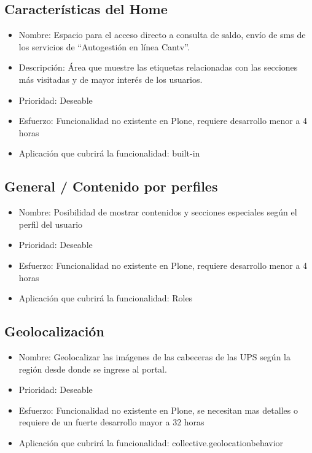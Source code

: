 \documentclass[11pt, letterpaper, oneside, spanish]{scrbook}
\begin{document}
\subsection{Características del Home}
\label{sec-2-1-52}

\begin{itemize}
\item Nombre: Espacio para el acceso directo a consulta de saldo, envío de sms de
  los servicios de “Autogestión en línea Cantv”.
\item Descripción: Área que muestre las etiquetas relacionadas con las secciones
  más visitadas y de mayor interés de los usuarios.
\item Prioridad: Deseable
\item Esfuerzo: Funcionalidad no existente en Plone, requiere desarrollo menor a 4
  horas
\item Aplicación que cubrirá la funcionalidad:  built-in
\end{itemize}
\subsection{General / Contenido por perfiles}
\label{sec-2-1-53}

\begin{itemize}
\item Nombre: Posibilidad de mostrar contenidos y secciones especiales según el
  perfil del usuario
\item Prioridad: Deseable
\item Esfuerzo: Funcionalidad no existente en Plone, requiere desarrollo menor a 4
  horas
\item Aplicación que cubrirá la funcionalidad: Roles
\end{itemize}
\subsection{Geolocalización}
\label{sec-2-1-54}

\begin{itemize}
\item Nombre: Geolocalizar las imágenes de las cabeceras de las UPS según la
  región desde donde se ingrese al portal.
\item Prioridad: Deseable
\item Esfuerzo: Funcionalidad no existente en Plone, se necesitan mas detalles o
  requiere de un fuerte desarrollo mayor a 32 horas
\item Aplicación que cubrirá la funcionalidad: collective.geolocationbehavior
\end{itemize}
\end{document}
